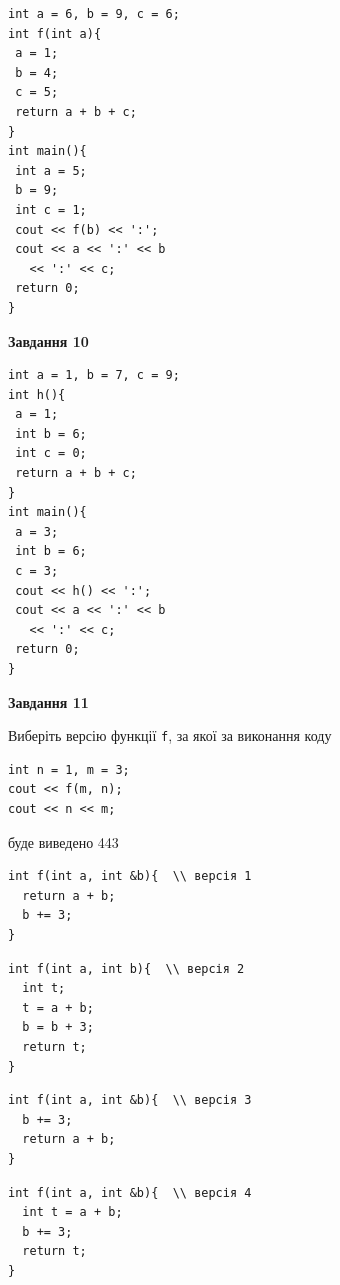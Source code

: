 \documentclass[12pt, ukrainian]{article}
\def\code#1{\Verb!#1!}
\begin{document}
{\begin {large}
\begin{minipage}[t]{7.0cm}
\begin{verbatim}
int a = 6, b = 9, c = 6;
int f(int a){
 a = 1;
 b = 4;
 c = 5;
 return a + b + c;
}
int main(){
 int a = 5;
 b = 9;
 int c = 1;
 cout << f(b) << ':';
 cout << a << ':' << b 
   << ':' << c;
 return 0;
}
\end{verbatim}



\begin{center}
\textbf{Завдання 10}
\end{center}
\vspace{-8mm}

\begin{verbatim}
int a = 1, b = 7, c = 9;
int h(){
 a = 1;
 int b = 6;
 int c = 0;
 return a + b + c;
}
int main(){
 a = 3;
 int b = 6;
 c = 3;
 cout << h() << ':';
 cout << a << ':' << b 
   << ':' << c;
 return 0;
}
\end{verbatim}

\end{minipage}
\vline \hspace{1mm}
\begin{minipage}[t]{11.0cm}

\begin{center}
\textbf{Завдання 11}
\end{center}
Виберіть версію функції \code{f}, за якої за виконання коду
\begin{verbatim}
int n = 1, m = 3;
cout << f(m, n);
cout << n << m;
\end{verbatim}

буде виведено 443

\begin{verbatim}
int f(int a, int &b){  \\ версія 1
  return a + b;
  b += 3;
}
\end{verbatim}

\vspace{-8mm}\begin{verbatim}
int f(int a, int b){  \\ версія 2
  int t;
  t = a + b;
  b = b + 3;
  return t;
}
\end{verbatim}

\vspace{-8mm}\begin{verbatim}
int f(int a, int &b){  \\ версія 3
  b += 3;
  return a + b;
}
\end{verbatim}

\vspace{-8mm}\begin{verbatim}
int f(int a, int &b){  \\ версія 4
  int t = a + b;
  b += 3;
  return t;
}
\end{verbatim}




\end{minipage}
\end{large}}
\end{document}

